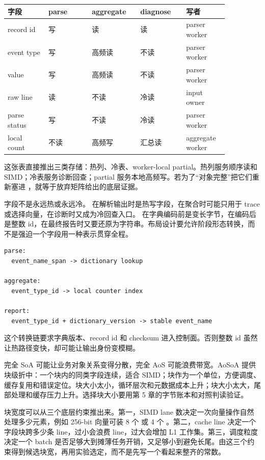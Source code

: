 \begin{center}
\small
\begin{tabular}{@{}p{0.16\linewidth}p{0.17\linewidth}p{0.19\linewidth}p{0.18\linewidth}p{0.16\linewidth}@{}}
\toprule
字段 & parse & aggregate & diagnose & 写者 \\
\midrule
record id & 写 & 读 & 读 & parser worker \\
event type & 写 & 高频读 & 不读 & parser worker \\
value & 写 & 高频读 & 不读 & parser worker \\
raw line & 读 & 不读 & 冷读 & input owner \\
parse status & 写 & 不读 & 冷读 & parser worker \\
local count & 不读 & 高频写 & 汇总读 & aggregate worker \\
\bottomrule
\end{tabular}
\end{center}

这张表直接推出三类存储：热列、冷表、worker-local partial。热列服务顺序读和 SIMD；冷表服务诊断回查；partial 服务本地高频写。若为了“对象完整”把它们重新塞进 ，就等于放弃矩阵给出的底层证据。

字段不是永远热或永远冷。 在解析输出时是热写字段，在聚合时可能只用于 trace 或选择向量，在诊断时又成为冷回查入口。 在字典编码前是变长字节，在编码后是整数 id，在最终报告时又要还原为字符串。布局设计要允许阶段形态转换，而不是强迫一个字段用一种表示贯穿全程。

\begin{lstlisting}[numbers=none,caption={字段形态随阶段变化}]
parse:
  event_name_span -> dictionary lookup

aggregate:
  event_type_id -> local counter index

report:
  event_type_id + dictionary_version -> stable event_name
\end{lstlisting}

这个转换链要求字典版本、record id 和 checksum 进入控制面。否则整数 id 虽然让热路径变快，却可能让输出身份变模糊。

完全 SoA 可能让业务对象关系变得分散，完全 AoS 可能浪费带宽。AoSoA 提供块级折中：一个块内的同类字段连续，适合 SIMD；块作为一个单位，方便调度、缓存复用和错误定位。块大小太小，循环层次和元数据成本上升；块大小太大，尾部处理和缓存压力上升。选择块大小要用第 5 章的字节账本和对照判读验证。

块宽度可以从三个底层约束推出来。第一，SIMD lane 数决定一次向量操作自然处理多少元素，例如 256-bit 向量可装 8 个  或 4 个 。第二，cache line 决定一个字段块跨多少条 line，过小会浪费 line，过大会增加 L1 工作集。第三，调度粒度决定一个 batch 是否足够大到摊薄任务开销，又足够小到避免长尾。由这三个约束得到候选块宽，再用实验选定，而不是先写一个看起来整齐的常数。

